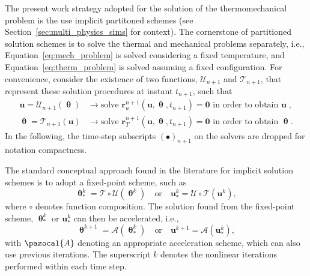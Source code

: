 The present work strategy adopted for the solution of the thermomechanical problem is the use implicit partitoned schemes (see Section~\ref{sec:multi_physics_sims} for context).
The cornerstone of partitioned solution schemes is to solve the thermal and mechanical problems separately, i.e., Equation~\eqref{eq:mech_problem} is solved considering a fixed temperature, and Equation~\eqref{eq:therm_problem} is solved assuming a fixed configuration.
For convenience, consider the existence of two functions, \(\bm{\mathcal{U}}_{n+1}\) and \(\bm{\mathcal{T}}_{n+1}\), that represent these solution procedures at instant \(t_{n+1}\), such that
\begin{align}
  \mathbf{u} = \bm{\mathcal{U}}_{n+1}(\bm{\uptheta}) & \rightarrow \text{solve } \mathbf{r}_{u}^{n+1}(\mathbf{u}, \bm{\uptheta}, t_{n+1})=\bm{0} \text{ in order to obtain } \mathbf{u}\;, \label{eq:def_solvers_u} \\
  \bm{\uptheta} = \bm{\mathcal{T}}_{n+1}(\mathbf{u}) & \rightarrow \text{solve } \mathbf{r}_{T}^{n+1}(\mathbf{u}, \bm{\uptheta}, t_{n+1})=\bm{0} \text{ in order to obtain } \bm{\uptheta}. \label{eq:def_solvers_t}
\end{align}
In the following, the time-step subscripts $(\bullet)_{n+1}$ on the solvers are dropped for notation compactness.

The standard conceptual approach found in the literature for implicit solution schemes is to adopt a fixed-point scheme, such as
\begin{equation}
  \bm{\uptheta}^{k}_* = \bm{\mathcal{T}} \circ \bm{\mathcal{U}}(\bm{\uptheta}^k) \quad \text{or} \quad \mathbf{u}^{k}_* = \bm{\mathcal{U}} \circ \bm{\mathcal{T}}(\mathbf{u}^k),
\end{equation}
where \(\circ\) denotes function composition.
The solution found from the fixed-point scheme, \(\bm{\uptheta}^{k}_*\) or \(\mathbf{u}^{k}_*\) can then be accelerated, i.e.,
\begin{equation}
  \bm{\uptheta}^{k+1} = \bm{\mathcal{A}}(\bm{\uptheta}^{k}_*) \quad \text{or} \quad \mathbf{u}^{k+1} = \bm{\mathcal{A}}(\mathbf{u}^{k}_*),
\end{equation}
with \(\pazocal{A}\) denoting an appropriate acceleration scheme, which can also use previous iterations.
The superscript \(k\) denotes the nonlinear iterations performed within each time step.


